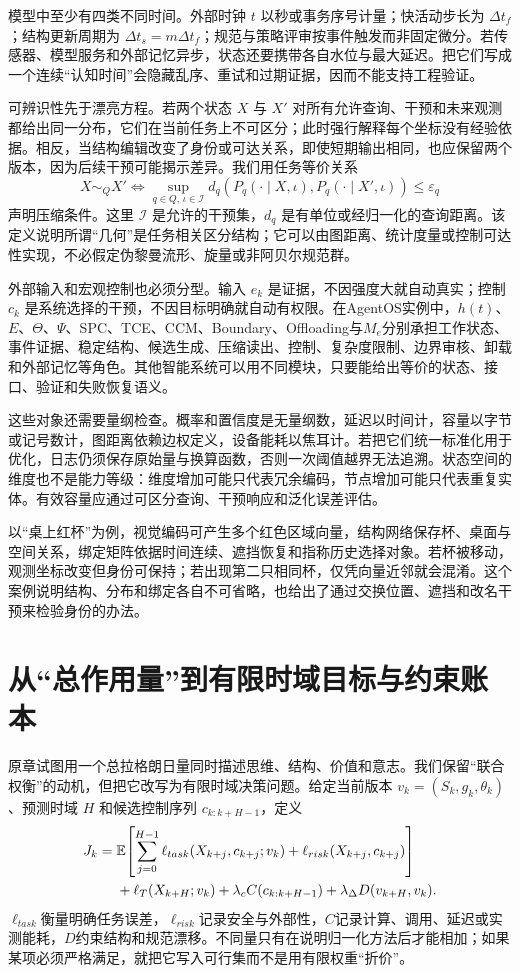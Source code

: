 模型中至少有四类不同时间。外部时钟 $t$ 以秒或事务序号计量；快活动步长为 $\Delta t_f$；结构更新周期为 $\Delta t_s=m\Delta t_f$；规范与策略评审按事件触发而非固定微分。若传感器、模型服务和外部记忆异步，状态还要携带各自水位与最大延迟。把它们写成一个连续“认知时间”会隐藏乱序、重试和过期证据，因而不能支持工程验证。

可辨识性先于漂亮方程。若两个状态 $X$ 与 $X'$ 对所有允许查询、干预和未来观测都给出同一分布，它们在当前任务上不可区分；此时强行解释每个坐标没有经验依据。相反，当结构编辑改变了身份或可达关系，即使短期输出相同，也应保留两个版本，因为后续干预可能揭示差异。我们用任务等价关系
\begin{equation}
X\sim_Q X'\iff \sup_{q\in Q,\,\iota\in\mathcal I}d_q\!\left(P_q(\cdot\mid X,\iota),P_q(\cdot\mid X',\iota)\right)\le\varepsilon_q
\end{equation}
声明压缩条件。这里 $\mathcal I$ 是允许的干预集，$d_q$ 是有单位或经归一化的查询距离。该定义说明所谓“几何”是任务相关区分结构；它可以由图距离、统计度量或控制可达性实现，不必假定伪黎曼流形、旋量或非阿贝尔规范群。

外部输入和宏观控制也必须分型。输入 $e_k$ 是证据，不因强度大就自动真实；控制 $c_k$ 是系统选择的干预，不因目标明确就自动有权限。在AgentOS实例中，$h(t)$、$E$、$\Theta$、$\Psi$、SPC、TCE、CCM、Boundary、Offloading与$M_e$分别承担工作状态、事件证据、稳定结构、候选生成、压缩读出、控制、复杂度限制、边界审核、卸载和外部记忆等角色。其他智能系统可以用不同模块，只要能给出等价的状态、接口、验证和失败恢复语义。

这些对象还需要量纲检查。概率和置信度是无量纲数，延迟以时间计，容量以字节或记号数计，图距离依赖边权定义，设备能耗以焦耳计。若把它们统一标准化用于优化，日志仍须保存原始量与换算函数，否则一次阈值越界无法追溯。状态空间的维度也不是能力等级：维度增加可能只代表冗余编码，节点增加可能只代表重复实体。有效容量应通过可区分查询、干预响应和泛化误差评估。

以“桌上红杯”为例，视觉编码可产生多个红色区域向量，结构网络保存杯、桌面与空间关系，绑定矩阵依据时间连续、遮挡恢复和指称历史选择对象。若杯被移动，观测坐标改变但身份可保持；若出现第二只相同杯，仅凭向量近邻就会混淆。这个案例说明结构、分布和绑定各自不可省略，也给出了通过交换位置、遮挡和改名干预来检验身份的办法。

\section{从“总作用量”到有限时域目标与约束账本}
\label{sec:section_1047}

原章试图用一个总拉格朗日量同时描述思维、结构、价值和意志。我们保留“联合权衡”的动机，但把它改写为有限时域决策问题。给定当前版本 $v_k=(S_k,g_k,\theta_k)$、预测时域 $H$ 和候选控制序列 $c_{k:k+H-1}$，定义
\begin{align}
J_k={}&\mathbb E\!\left[\sum_{j=0}^{H-1}\ell_{task}(X_{k+j},c_{k+j};v_k)+\ell_{risk}(X_{k+j},c_{k+j})\right] \notag\\
&+\ell_T(X_{k+H};v_k)+\lambda_c C(c_{k:k+H-1})+\lambda_\Delta D(v_{k+H},v_k).
\end{align}
$\ell_{task}$衡量明确任务误差，$\ell_{risk}$记录安全与外部性，$C$记录计算、调用、延迟或实测能耗，$D$约束结构和规范漂移。不同量只有在说明归一化方法后才能相加；如果某项必须严格满足，就把它写入可行集而不是用有限权重“折价”。

